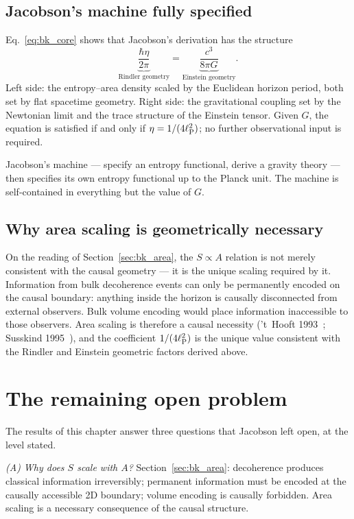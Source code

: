 \subsection{Jacobson's machine fully specified}
Eq.~\eqref{eq:bk_core} shows that Jacobson's derivation has the structure
\begin{equation}
\underbrace{\frac{\hbar\eta}{2\pi}}_{\text{Rindler geometry}}=\underbrace{\frac{c^3}{8\pi G}}_{\text{Einstein geometry}}.\label{eq:bk_structure}
\end{equation}
Left side: the entropy--area density scaled by the Euclidean horizon period, both set by flat spacetime geometry. Right side: the gravitational coupling set
by the Newtonian limit and the trace structure of the Einstein tensor. Given $G$, the equation is satisfied if and only if $\eta=1/(4\ell_{\mathrm P}^2)$; no further
observational input is required. \derived{}

Jacobson's machine --- specify an entropy functional, derive a gravity theory --- then specifies its own entropy functional up to the Planck unit. The
machine is self-contained in everything but the value of $G$. \derived

\subsection{Why area scaling is geometrically necessary}
On the reading of Section~\ref{sec:bk_area}, the $S\propto A$ relation is not merely consistent with the causal geometry --- it is the unique scaling required by it.
Information from bulk decoherence events can only be permanently encoded on the causal boundary: anything inside the horizon is causally disconnected from
external observers. Bulk volume encoding would place information inaccessible to those observers. Area scaling is therefore a causal necessity
('t~Hooft 1993~\cite{tHooft1993}; Susskind 1995~\cite{Susskind1995}), and the coefficient $1/(4\ell_{\mathrm P}^2)$ is the unique value consistent with the Rindler and Einstein
geometric factors derived above. \interp

\section{The remaining open problem}\label{sec:bk_open}
The results of this chapter answer three questions that Jacobson left open, at the level stated.

\emph{(A) Why does $S$ scale with $A$?} Section~\ref{sec:bk_area}: decoherence produces classical information irreversibly; permanent information must be
encoded at the causally accessible 2D boundary; volume encoding is causally forbidden. Area scaling is a necessary consequence of the causal structure.
\interp

